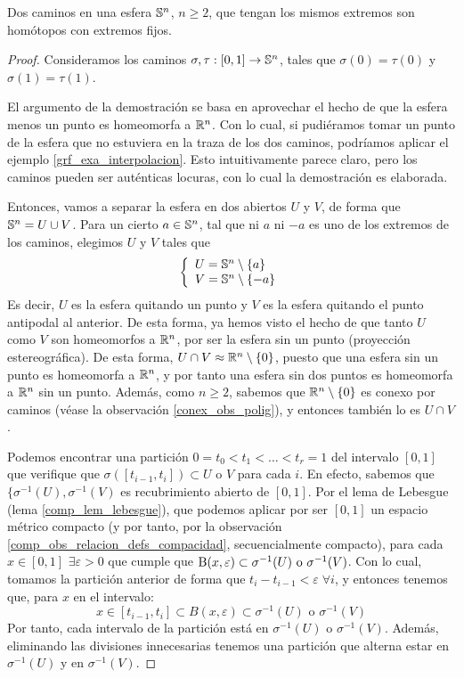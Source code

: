 \begin{prop}
	\label{grf_homotop_caminos_esfera}
	Dos caminos en una esfera $\mathbb{S}^n$, $n\geq 2$, que tengan los mismos extremos son homótopos con extremos fijos.

	\begin{proof}
		Consideramos los caminos $\sigma,\tau:[0,1]\to \mathbb{S}^n$, tales que $\sigma(0)=\tau(0)$ y $\sigma(1)=\tau(1)$.
		
		El argumento de la demostración se basa en aprovechar el hecho de que la esfera menos un punto es homeomorfa a $\mathbb{R}^n$. Con lo cual, si pudiéramos tomar un punto de la esfera que no estuviera en la traza de los dos caminos, podríamos aplicar el ejemplo \ref{grf_exa_interpolacion}. Esto intuitivamente parece claro, pero los caminos pueden ser auténticas locuras, con lo cual la demostración es elaborada.
		
		Entonces, vamos a separar la esfera en dos abiertos $U$ y $V$, de forma que $\mathbb{S}^n=U\cup V$. Para un cierto $a\in\mathbb{S}^n$, tal que ni $a$ ni $-a$ es uno de los extremos de los caminos, elegimos $U$ y $V$ tales que
		\[\left\{\begin{array}{l}
			U = \mathbb{S}^n\setminus\{a\} \\
			V = \mathbb{S}^n\setminus\{-a\}
		\end{array}\right.\]
		Es decir, $U$ es la esfera quitando un punto y $V$ es la esfera quitando el punto antipodal al anterior. De esta forma, ya hemos visto el hecho de que tanto $U$ como $V$ son homeomorfos a $\mathbb{R}^n$, por ser la esfera sin un punto (proyección estereográfica). De esta forma, $U\cap V\approx\mathbb{R}^n\setminus\{0\}$, puesto que una esfera sin un punto es homeomorfa a $\mathbb{R}^n$, y por tanto una esfera sin dos puntos es homeomorfa a $\mathbb{R}^n$ sin un punto. Además, como $n\geq 2$, sabemos que $\mathbb{R}^n\setminus\{0\}$ es conexo por caminos (véase la observación \ref{conex_obs_polig}), y entonces también lo es $U\cap V$.
		
		Podemos encontrar una partición $0=t_0<t_1<\dots<t_r=1$ del intervalo $[0,1]$ que verifique que $\sigma([t_{i-1},t_i])\subset U\text{ o }V$ para cada $i$. En efecto, sabemos que $\{\sigma^{-1}(U), \sigma^{-1}(V)$ es recubrimiento abierto de $[0,1]$. Por el lema de Lebesgue (lema \ref{comp_lem_lebesgue}), que podemos aplicar por ser $[0,1]$ un espacio métrico compacto (y por tanto, por la observación \ref{comp_obs_relacion_defs_compacidad}, secuencialmente compacto), para cada $x\in [0,1]$ $\exists\varepsilon>0$ que cumple que $\operatorname{B}(x,\varepsilon)\subset\sigma^{-1}(U)\text{ o }\sigma^{-1}(V)$. Con lo cual, tomamos la partición anterior de forma que $t_i-t_{i-1}<\varepsilon\;\forall i$, y entonces tenemos que, para $x$ en el intervalo:
		\[x\in [t_{i-1}, t_i]\subset B(x,\varepsilon)\subset\sigma^{-1}(U)\text{ o }\sigma^{-1}(V)\]
		Por tanto, cada intervalo de la partición está en $\sigma^{-1}(U)$ o $\sigma^{-1}(V)$. Además, eliminando las divisiones innecesarias tenemos una partición que alterna estar en $\sigma^{-1}(U)$ y en $\sigma^{-1}(V)$.
		

\end{proof}
\end{prop}
